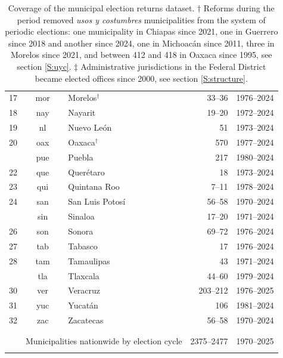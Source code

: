 \documentclass[letter,12pt]{article}
\newcommand{\mc}{\multicolumn}
\begin{document}
\begin{table}
{\begin{tabular}{rclrc}
      17 & mor & Morelos$^\dagger$                      &     33--36           & 1976--2024 \\
      18 & nay & Nayarit                               &     19--20           & 1972--2024 \\
      19 & nl  & Nuevo León                            &         51           & 1973--2024 \\
      20 & oax & Oaxaca$^\dagger$                       &        570           & 1977--2024 \\ \hdashline
      21 & pue & Puebla                                &        217           & 1980--2024 \\
      22 & que & Querétaro                             &         18           & 1973--2024 \\
      23 & qui & Quintana Roo                          &      7--11           & 1978--2024 \\
      24 & san & San Luis Potosí                       &     56--58           & 1970--2024 \\ \hdashline
      25 & sin & Sinaloa                               &     17--20           & 1971--2024 \\
      26 & son & Sonora                                &     69--72           & 1976--2024 \\
      27 & tab & Tabasco                               &         17           & 1976--2024 \\
      28 & tam & Tamaulipas                            &         43           & 1971--2024 \\ \hdashline
      29 & tla & Tlaxcala                              &     44--60           & 1979--2024 \\
      30 & ver & Veracruz                              &   203--212           & 1976--2025 \\
      31 & yuc & Yucatán                               &        106           & 1981--2024 \\
      32 & zac & Zacatecas                             &     56--58           & 1970--2024 \\
      \\ [-1.8ex] \hline
      \\ [-1.8ex] 
         & \mc{2}{l}{Municipalities nationwide by election cycle} & 2375--2477 & 1970--2025 \\
      \\ [-1.8ex] \hline

    \end{tabular}
}
\caption{Coverage of the municipal election returns dataset. $\dagger$ Reforms during the period removed \emph{usos y costumbres} municipalities from the system of periodic elections: one municipality in Chiapas since 2021, one in Guerrero since 2018 and another since 2024, one in Michoacán since 2011, three in Morelos since 2021, and between 412 and 418 in Oaxaca since 1995, see section \ref{S:uyc}. $\ddagger$ Administrative jurisdictions in the Federal District became elected offices since 2000, see section \ref{S:structure}.}\label{T:coverage}
\end{table}
\end{document}
